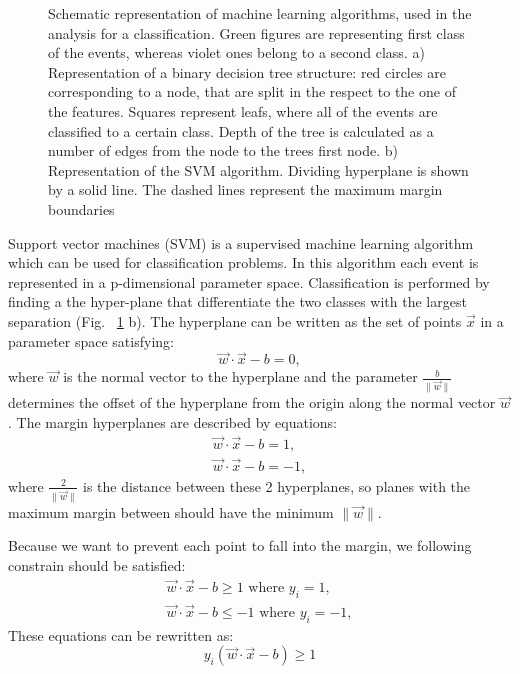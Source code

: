 \begin{figure}[!tbp]
\begin{minipage}[h]{0.49\linewidth}
\end{minipage}
\hfill
\begin{minipage}[h]{0.49\linewidth}
\end{minipage}
\caption{Schematic representation of machine learning algorithms, used in the analysis for a classification. Green figures are representing first class of the events, whereas violet ones belong to a second class.  
a) Representation of a binary decision tree structure: red circles are corresponding to a node, that are split in the respect to the one of the features. Squares represent leafs, where all of the events are classified to a certain class. Depth of the tree is calculated as a number of edges from the node to the trees first node. 
b) Representation of the SVM algorithm. Dividing hyperplane is shown by a solid line. The dashed lines represent the maximum margin boundaries}
\label{fig:MLAlgo}
\end{figure}

Support vector machines (SVM) is a supervised machine learning algorithm which can be used for classification problems. In this algorithm each event is represented in a p-dimensional parameter space. Classification is performed by finding a the hyper-plane that differentiate the two classes with the largest separation (Fig. ~\ref{fig:MLAlgo} b). The hyperplane can be written as the set of points $\vec {x}$ in a parameter space satisfying:
\begin{equation}
\vec{w}\cdot \vec{x} - b = 0,
\end{equation}
where $\vec{w}$ is the normal vector to the hyperplane and the parameter $\frac {b}{\|{\vec {w}}\|}$ determines the offset of the hyperplane from the origin along the normal vector $\vec {w}$. The margin hyperplanes are described by equations:
\begin{eqnarray}
\vec{w}\cdot \vec{x} - b = 1, \\
\vec{w}\cdot \vec{x} - b = -1,
\end{eqnarray}
where $\frac{2}{\|\vec{w}\|}$ is the distance between these 2 hyperplanes, so planes with the maximum margin between should have the minimum $\|\vec{w}\|$. 

Because we want to prevent each point to fall into the margin, we following constrain should be satisfied: 
\begin{eqnarray}
\vec{w}\cdot \vec{x} - b \geqslant 1 \textrm{ where } y_i = 1,\\
\vec{w}\cdot \vec{x} - b \leqslant -1 \textrm{ where } y_i = -1,
\end{eqnarray}
These equations can be rewritten as:
\begin{equation}
y_i(\vec{w}\cdot \vec{x} - b ) \geqslant 1
\end{equation}

